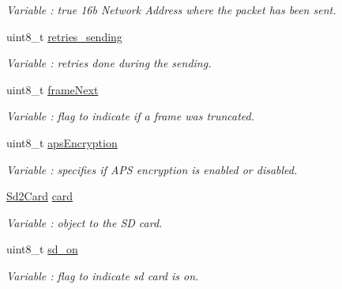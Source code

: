 \begin{DoxyCompactItemize}
\begin{DoxyCompactList}\small\item\em Variable \+: true 16b Network Address where the packet has been sent. \end{DoxyCompactList}\item 
uint8\+\_\+t \hyperlink{class_wasp_x_bee_core_a26e8a05686e34c22b2b9a3bd6025a7e2}{retries\+\_\+sending}\hypertarget{class_wasp_x_bee_core_a26e8a05686e34c22b2b9a3bd6025a7e2}{}\label{class_wasp_x_bee_core_a26e8a05686e34c22b2b9a3bd6025a7e2}

\begin{DoxyCompactList}\small\item\em Variable \+: retries done during the sending. \end{DoxyCompactList}\item 
uint8\+\_\+t \hyperlink{class_wasp_x_bee_core_ad9dc96f926d2bcfc3d4775839300ac83}{frame\+Next}\hypertarget{class_wasp_x_bee_core_ad9dc96f926d2bcfc3d4775839300ac83}{}\label{class_wasp_x_bee_core_ad9dc96f926d2bcfc3d4775839300ac83}

\begin{DoxyCompactList}\small\item\em Variable \+: flag to indicate if a frame was truncated. \end{DoxyCompactList}\item 
uint8\+\_\+t \hyperlink{class_wasp_x_bee_core_a71d02b6025f905a83b1af7b2c5d0a012}{aps\+Encryption}\hypertarget{class_wasp_x_bee_core_a71d02b6025f905a83b1af7b2c5d0a012}{}\label{class_wasp_x_bee_core_a71d02b6025f905a83b1af7b2c5d0a012}

\begin{DoxyCompactList}\small\item\em Variable \+: specifies if A\+PS encryption is enabled or disabled. \end{DoxyCompactList}\item 
\hyperlink{class_sd2_card}{Sd2\+Card} \hyperlink{class_wasp_x_bee_core_a362c61f39ab608841a418ce16aa4085e}{card}\hypertarget{class_wasp_x_bee_core_a362c61f39ab608841a418ce16aa4085e}{}\label{class_wasp_x_bee_core_a362c61f39ab608841a418ce16aa4085e}

\begin{DoxyCompactList}\small\item\em Variable \+: object to the SD card. \end{DoxyCompactList}\item 
uint8\+\_\+t \hyperlink{class_wasp_x_bee_core_a4fdb0418e9833849d07e43f851803b5a}{sd\+\_\+on}\hypertarget{class_wasp_x_bee_core_a4fdb0418e9833849d07e43f851803b5a}{}\label{class_wasp_x_bee_core_a4fdb0418e9833849d07e43f851803b5a}

\begin{DoxyCompactList}\small\item\em Variable \+: flag to indicate sd card is on. \end{DoxyCompactList}\end{DoxyCompactItemize}


